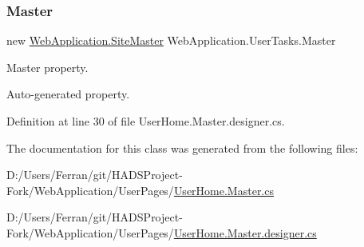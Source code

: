 \subsubsection{\texorpdfstring{Master}{Master}}
{\footnotesize\ttfamily new \mbox{\hyperlink{classWebApplication_1_1SiteMaster}{Web\+Application.\+Site\+Master}} Web\+Application.\+User\+Tasks.\+Master\hspace{0.3cm}{\ttfamily [get]}}



Master property. 

Auto-\/generated property. 

Definition at line 30 of file User\+Home.\+Master.\+designer.\+cs.



The documentation for this class was generated from the following files\+:\begin{DoxyCompactItemize}
\item 
D\+:/\+Users/\+Ferran/git/\+H\+A\+D\+S\+Project-\/\+Fork/\+Web\+Application/\+User\+Pages/\mbox{\hyperlink{UserHome_8Master_8cs}{User\+Home.\+Master.\+cs}}\item 
D\+:/\+Users/\+Ferran/git/\+H\+A\+D\+S\+Project-\/\+Fork/\+Web\+Application/\+User\+Pages/\mbox{\hyperlink{UserHome_8Master_8designer_8cs}{User\+Home.\+Master.\+designer.\+cs}}\end{DoxyCompactItemize}
